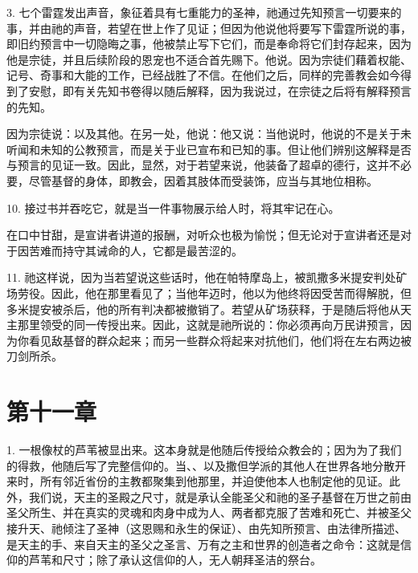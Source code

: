3. 七个雷霆发出声音，象征着具有七重能力的圣神，祂通过先知预言一切要来的事，并由祂的声音，若望在世上作了见证；但因为他说他将要写下雷霆所说的事，即旧约预言中一切隐晦之事，他被禁止写下它们，而是奉命将它们封存起来，因为他是宗徒，并且后续阶段的恩宠也不适合首先赐下。他说。因为宗徒们藉着权能、记号、奇事和大能的工作，已经战胜了不信。在他们之后，同样的完善教会如今得到了安慰，即有关先知书卷得以随后解释，因为我说过，在宗徒之后将有解释预言的先知。\par

因为宗徒说：以及其他。在另一处，他说：他又说：当他说时，他说的不是关于未听闻和未知的公教预言，而是关于业已宣布和已知的事。但让他们辨别这解释是否与预言的见证一致。因此，显然，对于若望来说，他装备了超卓的德行，这并不必要，尽管基督的身体，即教会，因着其肢体而受装饰，应当与其地位相称。\par

10. 接过书并吞吃它，就是当一件事物展示给人时，将其牢记在心。\par

在口中甘甜，是宣讲者讲道的报酬，对听众也极为愉悦；但无论对于宣讲者还是对于因苦难而持守其诫命的人，它都是最苦涩的。\par

11. 祂这样说，因为当若望说这些话时，他在帕特摩岛上，被凯撒多米提安判处矿场劳役。因此，他在那里看见了；当他年迈时，他以为他终将因受苦而得解脱，但多米提安被杀后，他的所有判决都被撤销了。若望从矿场获释，于是随后将他从天主那里领受的同一传授出来。因此，这就是祂所说的：你必须再向万民讲预言，因为你看见敌基督的群众起来；而另一些群众将起来对抗他们，他们将在左右两边被刀剑所杀。\par


\section{第十一章}

1. 一根像杖的芦苇被显出来。这本身就是他随后传授给众教会的；因为为了我们的得救，他随后写了完整信仰的。当、、以及撒但学派的其他人在世界各地分散开来时，所有邻近省份的主教都聚集到他那里，并迫使他本人也制定他的见证。此外，我们说，天主的圣殿之尺寸，就是承认全能圣父和祂的圣子基督在万世之前由圣父所生、并在真实的灵魂和肉身中成为人、两者都克服了苦难和死亡、并被圣父接升天、祂倾注了圣神（这恩赐和永生的保证）、由先知所预言、由法律所描述、是天主的手、来自天主的圣父之圣言、万有之主和世界的创造者之命令：这就是信仰的芦苇和尺寸；除了承认这信仰的人，无人朝拜圣洁的祭台。\par

